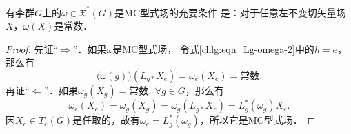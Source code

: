 \begin{theorem}\label{chlg:thm_left-1form}
    有李群$G$上的$\omega\in \mathfrak{X}^*(G)$是MC型式场的充要条件
    是：对于任意左不变切矢量场$X$，$\omega(X)$是常数．
\end{theorem}
\begin{proof}
    先证“$\Rightarrow$”．如果$\omega$是MC型式场，
    令式\eqref{chlg:eqn_Lg-omega-2}中的$h=e$，那么有
    \begin{equation}
        \bigl(\omega(g)\bigr)(L_{g*}X_e)=\omega_e (X_e)=\text{常数}.
    \end{equation}
    再证“$\Leftarrow$”．如果$\omega_g (X_g)=\text{常数},\ \forall g\in G$，那么有
    \begin{equation}
        \omega_e (X_e) = \omega_g (X_g) =\omega_g (L_{g*}X_e) = L_g^* (\omega_g) X_e. 
    \end{equation}
    因$X_e\in T_e(G)$是任取的，故有$\omega_e=L_g^* (\omega_g)$，所以它是MC型式场．
\end{proof}



